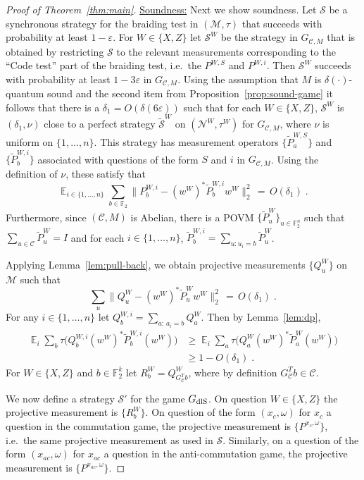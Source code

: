 \documentclass[11pt]{article}
\theoremstyle{definition}
\newcommand{\code}{\mathcal{C}}
\newcommand{\strategy}{\mathscr{S}}
\newcommand{\Id}{\ensuremath{I}}
\DeclareMathOperator*{\Expectation}{\mathbb{E}}
\newcommand{\Es}[1]{\Expectation_{#1}}
\newcommand{\field}{\mathbb{F}_2}
\newcommand{\dlS}{\ensuremath{\rm dlS}}
\newcommand{\F}{\ensuremath{\mathbb{F}}}
\newcommand{\mC}{\ensuremath{\mathcal{C}}}
\newcommand{\mM}{\ensuremath{\mathcal{M}}}
\newcommand{\eps}{\varepsilon}
\newcommand{\mN}{\mathcal{N}}
\begin{document}
\begin{proof}[Proof of Theorem~\ref{thm:main}]
\underline{Soundness:} Next we show soundness. Let $\strategy$ be a synchronous strategy for the braiding test  in  $(\mM,\tau)$ that succeeds with probability at least $1-\eps$. For $W\in\{X,Z\}$ let $\strategy^W$ be the strategy in $G_{\code,M}$ that is obtained by restricting $\strategy$ to the relevant measurements  corresponding to the ``Code test'' part of the braiding test, i.e.\ the $P^{W,S}$ and $P^{W,i}$.  Then $\strategy^W$ succeeds with probability at least $1-3\eps$ in $G_{\code,M}$. Using the assumption that $M$ is $\delta(\cdot)$-quantum sound and the second item from Proposition~\ref{prop:sound-game} it follows that there is a $\delta_1 = O({\delta(6\eps)})$ such that for each $W\in\{X,Z\}$, $\strategy^W$ is $(\delta_1,\nu)$ close to a perfect strategy $\tilde{\strategy}^W$ on $(\mN^W,\tau^W)$ for $G_{\code,M}$, where $\nu$ is uniform on $\{1,\ldots,n\}$. This strategy has measurement operators $\{ \tilde{P}^{W,S}_a\}$ and $\{\tilde{P}^{W,i}_b\}$ associated with questions of the form $S$ and $i$ in $G_{\code,M}$. Using the definition of $\nu$, these satisfy that 
\begin{equation}\label{eq:main-0}
\Es{i\in\{1,\ldots,n\}}\sum_{b \in \F_2} \big\|P^{W,i}_b - (w^W)^* \tilde{P}_b^{W,i} w^W \big\|^2_2 \,=\, O(\delta_1)\;.
\end{equation}
Furthermore, since $(\code,M)$ is Abelian, there is a  POVM $\{\tilde{P}^W_u\}_{u\in \field^n}$ such that $\sum_{u\in \code}\tilde{P}^W_u = \Id$ and for each $i\in \{1,\ldots,n\}$, $\tilde{P}^{W,i}_b = \sum_{u:u_i=b} \tilde{P}^W_u$.
 
Applying Lemma~\ref{lem:pull-back}, we obtain projective measurements $\{Q^W_u\}$ on $\mM$ such that 
\begin{equation}\label{eq:main-1}
\sum_u \big\|Q^W_u - (w^W)^* \tilde{P}_u^W w^W \big\|^2_2 \,=\, O(\delta_1)\;.
\end{equation}
For any $i\in\{1,\ldots,n\}$ let $Q^{W,i}_b = \sum_{a:\,a_i=b}  Q^W_a$. Then by Lemma~\ref{lem:dp},
\begin{align*}
\Es{i}\sum_b \tau\big( Q^{W,i}_b (w^W)^*\tilde{P}^{W,i}_b(w^W) \big)
&\geq \Es{i}\sum_a \tau\big( Q^{W}_a (w^W)^*\tilde{P}^{W}_a(w^W) \big)\\
&\geq 1-O(\delta_1)\;.
\end{align*}
For $W\in\{X,Z\}$ and $b\in \F_2^k$ let $R^W_b = Q^W_{G_\mC^T b}$, where by definition $G_\mC^T b\in \mC$. 

We now define a strategy $\strategy'$ for the game $G_{\dlS}$. On question $W\in \{X,Z\}$ the projective measurement is $\{R^W_b\}$. On question of the form $(x_c,\omega)$ for $x_c$ a question in the commutation game, the projective measurement is $\{P^{x_c,\omega}\}$, i.e.\ the same projective measurement as used in $\strategy$. Similarly, on a question of the form $(x_{ac},\omega)$ for $x_{ac}$ a question in the anti-commutation game, the projective measurement is $\{P^{x_{ac},\omega}\}$.


\end{proof}
\end{document}
